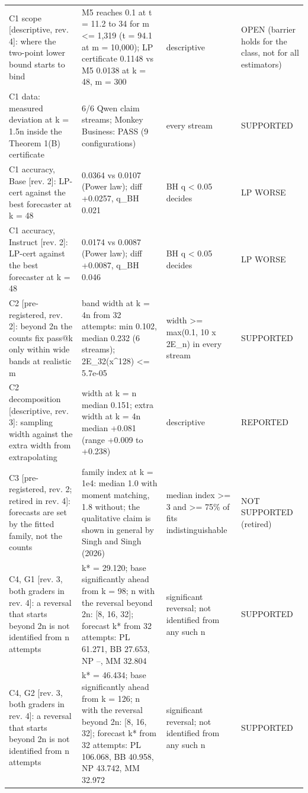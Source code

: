 \begin{table}[t]
\begin{tabular}{p{1.6in}p{2.0in}p{0.95in}p{0.75in}}
C1 scope [descriptive, rev. 4]: where the two-point lower bound starts to bind & M5 reaches 0.1 at t = 11.2 to 34 for m <= 1,319 (t = 94.1 at m = 10,000); LP certificate 0.1148 vs M5 0.0138 at k = 48, m = 300 & descriptive & OPEN (barrier holds for the class, not for all estimators) \\
C1 data: measured deviation at k = 1.5n inside the Theorem 1(B) certificate & 6/6 Qwen claim streams; Monkey Business: PASS (9 configurations) & every stream & SUPPORTED \\
C1 accuracy, Base [rev. 2]: LP-cert against the best forecaster at k = 48 & 0.0364 vs 0.0107 (Power law); diff +0.0257, q\_BH 0.021 & BH q < 0.05 decides & LP WORSE \\
C1 accuracy, Instruct [rev. 2]: LP-cert against the best forecaster at k = 48 & 0.0174 vs 0.0087 (Power law); diff +0.0087, q\_BH 0.046 & BH q < 0.05 decides & LP WORSE \\
C2 [pre-registered, rev. 2]: beyond 2n the counts fix pass@k only within wide bands at realistic m & band width at k = 4n from 32 attempts: min 0.102, median 0.232 (6 streams); 2E\_32(x^128) <= 5.7e-05 & width >= max(0.1, 10 x 2E\_n) in every stream & SUPPORTED \\
C2 decomposition [descriptive, rev. 3]: sampling width against the extra width from extrapolating & width at k = n median 0.151; extra width at k = 4n median +0.081 (range +0.009 to +0.238) & descriptive & REPORTED \\
C3 [pre-registered, rev. 2; retired in rev. 4]: forecasts are set by the fitted family, not the counts & family index at k = 1e4: median 1.0 with moment matching, 1.8 without; the qualitative claim is shown in general by Singh and Singh (2026) & median index >= 3 and >= 75\% of fits indistinguishable & NOT SUPPORTED (retired) \\
C4, G1 [rev. 3, both graders in rev. 4]: a reversal that starts beyond 2n is not identified from n attempts & k* = 29.120; base significantly ahead from k = 98; n with the reversal beyond 2n: [8, 16, 32]; forecast k* from 32 attempts: PL 61.271, BB 27.653, NP --, MM 32.804 & significant reversal; not identified from any such n & SUPPORTED \\
C4, G2 [rev. 3, both graders in rev. 4]: a reversal that starts beyond 2n is not identified from n attempts & k* = 46.434; base significantly ahead from k = 126; n with the reversal beyond 2n: [8, 16, 32]; forecast k* from 32 attempts: PL 106.068, BB 40.958, NP 43.742, MM 32.972 & significant reversal; not identified from any such n & SUPPORTED \\

\end{tabular}
\end{table}

